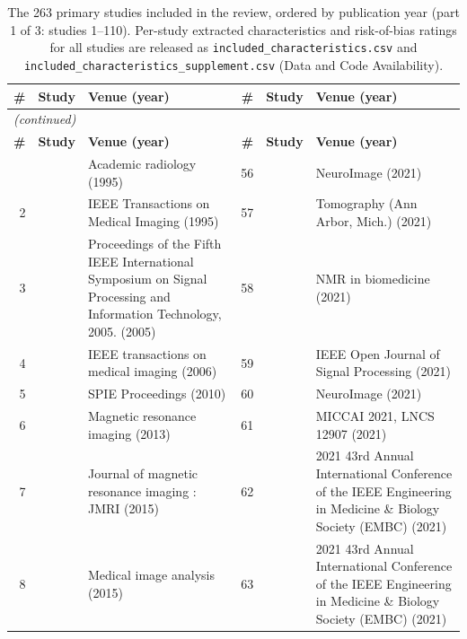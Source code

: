 \documentclass[11pt]{article}
\begin{document}
{\def\baselinestretch{1}\scriptsize
\setlength{\tabcolsep}{3pt}
\renewcommand{\arraystretch}{1.06}
\begin{longtable}{r l p{} r l p{}}
\caption{The 263 primary studies included in the review, ordered by publication year (part 1 of 3: studies 1--110). Per-study extracted characteristics and risk-of-bias ratings for all studies are released as \texttt{included\_characteristics.csv} and \texttt{included\_characteristics\_supplement.csv} (Data and Code Availability).}\label{tab:supp_included_1}\\
\hline
\textbf{\#} & \textbf{Study} & \textbf{Venue (year)} & \textbf{\#} & \textbf{Study} & \textbf{Venue (year)} \\
\hline
\endfirsthead
\multicolumn{6}{l}{\footnotesize\emph{(continued)}}\\
\hline
\textbf{\#} & \textbf{Study} & \textbf{Venue (year)} & \textbf{\#} & \textbf{Study} & \textbf{Venue (year)} \\
\hline
\endhead
\hline
\endfoot
1 & \cite{gardner1995detection} & Academic radiology (1995) & 56 & \cite{duffy2021retrospective} & NeuroImage (2021) \\
2 & \cite{cao1995using} & IEEE Transactions on Medical Imaging (1995) & 57 & \cite{kim2021simultaneous} & Tomography (Ann Arbor, Mich.) (2021) \\
3 & \cite{fadeev2005quality} & Proceedings of the Fifth IEEE International Symposium on Signal Processing and Information Technology, 2005. (2005) & 58 & \cite{gao2021xqsm} & NMR in biomedicine (2021) \\
4 & \cite{tisdall2006using} & IEEE transactions on medical imaging (2006) & 59 & \cite{kulkarni2021dictionary} & IEEE Open Journal of Signal Processing (2021) \\
5 & \cite{miao2010comprehensive} & SPIE Proceedings (2010) & 60 & \cite{tanno2021uncertainty} & NeuroImage (2021) \\
6 & \cite{miao2013a} & Magnetic resonance imaging (2013) & 61 & \cite{karimi2021accurate} & MICCAI 2021, LNCS 12907 (2021) \\
7 & \cite{li2015artifactual} & Journal of magnetic resonance imaging : JMRI (2015) & 62 & \cite{garmaoehmichen2021evaluation} & 2021 43rd Annual International Conference of the IEEE Engineering in Medicine \& Biology Society (EMBC) (2021) \\
8 & \cite{ning2015sparse} & Medical image analysis (2015) & 63 & \cite{kumar2021learning} & 2021 43rd Annual International Conference of the IEEE Engineering in Medicine \& Biology Society (EMBC) (2021) \\

\end{longtable}}
\end{document}
